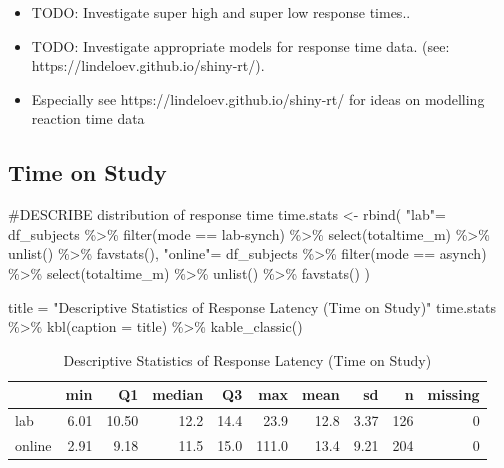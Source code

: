 \documentclass[
  letterpaper,
  DIV=11,
  numbers=noendperiod]{scrreprt}
\newenvironment{Shaded}{\begin{snugshade}}{\end{snugshade}}
\newcommand{\AttributeTok}[1]{\textcolor[rgb]{0.40,0.45,0.13}{#1}}
\newcommand{\CommentTok}[1]{\textcolor[rgb]{0.37,0.37,0.37}{#1}}
\newcommand{\FunctionTok}[1]{\textcolor[rgb]{0.28,0.35,0.67}{#1}}
\newcommand{\NormalTok}[1]{\textcolor[rgb]{0.00,0.23,0.31}{#1}}
\newcommand{\OtherTok}[1]{\textcolor[rgb]{0.00,0.23,0.31}{#1}}
\newcommand{\SpecialCharTok}[1]{\textcolor[rgb]{0.37,0.37,0.37}{#1}}
\newcommand{\StringTok}[1]{\textcolor[rgb]{0.13,0.47,0.30}{#1}}
\begin{document}
\begin{itemize}
\item
  {TODO: Investigate super high and super low response times.}.
\item
  {TODO: Investigate appropriate models for response time data. (see:
  https://lindeloev.github.io/shiny-rt/)}.
\item
  Especially see https://lindeloev.github.io/shiny-rt/ for ideas on
  modelling reaction time data
\end{itemize}

\hypertarget{time-on-study}{%
\subsection{Time on Study}\label{time-on-study}}

\begin{Shaded}
\begin{Highlighting}[]
\CommentTok{\#DESCRIBE distribution of response time}
\NormalTok{time.stats }\OtherTok{\textless{}{-}} \FunctionTok{rbind}\NormalTok{(}
  \StringTok{"lab"}\OtherTok{=}\NormalTok{ df\_subjects }\SpecialCharTok{\%\textgreater{}\%} \FunctionTok{filter}\NormalTok{(mode }\SpecialCharTok{==} \StringTok{\textquotesingle{}lab{-}synch\textquotesingle{}}\NormalTok{) }\SpecialCharTok{\%\textgreater{}\%} \FunctionTok{select}\NormalTok{(totaltime\_m) }\SpecialCharTok{\%\textgreater{}\%} \FunctionTok{unlist}\NormalTok{() }\SpecialCharTok{\%\textgreater{}\%} \FunctionTok{favstats}\NormalTok{(),}
  \StringTok{"online"}\OtherTok{=}\NormalTok{ df\_subjects }\SpecialCharTok{\%\textgreater{}\%} \FunctionTok{filter}\NormalTok{(mode }\SpecialCharTok{==} \StringTok{\textquotesingle{}asynch\textquotesingle{}}\NormalTok{) }\SpecialCharTok{\%\textgreater{}\%} \FunctionTok{select}\NormalTok{(totaltime\_m) }\SpecialCharTok{\%\textgreater{}\%} \FunctionTok{unlist}\NormalTok{() }\SpecialCharTok{\%\textgreater{}\%} \FunctionTok{favstats}\NormalTok{()}
\NormalTok{)}

\NormalTok{title }\OtherTok{=} \StringTok{"Descriptive Statistics of Response Latency (Time on Study)"}
\NormalTok{time.stats }\SpecialCharTok{\%\textgreater{}\%} \FunctionTok{kbl}\NormalTok{(}\AttributeTok{caption =}\NormalTok{ title) }\SpecialCharTok{\%\textgreater{}\%} \FunctionTok{kable\_classic}\NormalTok{()}
\end{Highlighting}
\end{Shaded}

\begin{table}

\caption{Descriptive Statistics of Response Latency (Time on Study)}
\centering
\begin{tabular}[t]{l|r|r|r|r|r|r|r|r|r}
\hline
  & min & Q1 & median & Q3 & max & mean & sd & n & missing\\
\hline
lab & 6.01 & 10.50 & 12.2 & 14.4 & 23.9 & 12.8 & 3.37 & 126 & 0\\
\hline
online & 2.91 & 9.18 & 11.5 & 15.0 & 111.0 & 13.4 & 9.21 & 204 & 0\\
\hline
\end{tabular}
\end{table}
\end{document}
